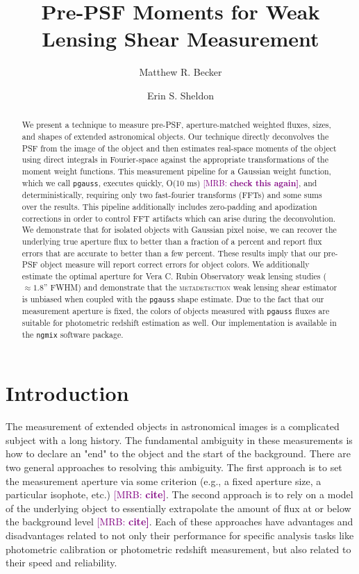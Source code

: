 \documentclass[twocolappendix, appendixfloats, numberedappendix, twocolumn, apj]{openjournal}
\newcommand{\mrb}[1]{\textcolor{purple}{[MRB: \bf #1]}\xspace}
\newcommand{\mdet}{\textsc{metadetection}\xspace}
\newcommand{\pgauss}{\texttt{pgauss}\xspace}
\begin{document}
\title{Pre-PSF Moments for Weak Lensing Shear Measurement}

\author{Matthew R. Becker}
\author{Erin S. Sheldon}

\begin{abstract}
  We present a technique to measure pre-PSF, aperture-matched weighted fluxes, sizes,
  and shapes of extended astronomical objects. Our technique directly deconvolves the
  PSF from the image of the object and then estimates real-space moments of the object
  using direct integrals in Fourier-space against the appropriate transformations of the
  moment weight functions. This measurement pipeline for a Gaussian weight function,
  which we call \pgauss, executes quickly, O(10 ms) \mrb{check this again}, and
  deterministically, requiring only two fast-fourier transforms (FFTs) and some sums
  over the results. This pipeline additionally includes zero-padding and apodization
  corrections in order to control FFT artifacts which can arise during the
  deconvolution. We demonstrate that for isolated objects with Gaussian pixel noise, 
  we can recover the underlying true aperture flux to better than a fraction of a percent 
  and report flux errors that are accurate to better than a few percent. These results imply that 
  our pre-PSF object measure will report correct errors for object colors. We additionally estimate the optimal
  aperture for Vera C. Rubin Observatory weak lensing studies ($\approx1.8$'' FWHM) and
  demonstrate that the \mdet weak lensing shear estimator is unbiased when coupled with
  the \pgauss shape estimate. Due to the fact that our measurement aperture is fixed,
  the colors of objects measured with \pgauss fluxes are suitable for photometric
  redshift estimation as well. Our implementation is available in the \texttt{ngmix}
  software package.
\end{abstract}

\section{Introduction}\label{sec:intro}

The measurement of extended objects in astronomical images is a complicated subject with a long
history. The fundamental ambiguity in these measurements is how to declare an "end" to the object
and the start of the background. There are two general approaches to resolving this ambiguity. The
first approach is to set the measurement aperture via some criterion (e.g., a fixed aperture size,
a particular isophote, etc.) \mrb{cite}. The second approach is to rely on a model of the underlying object to
essentially extrapolate the amount of flux at or below the background level \mrb{cite}. Each of these approaches
have advantages and disadvantages related to not only their performance for specific analysis tasks
like photometric calibration or photometric redshift measurement, but also related to their speed and
reliability.
\end{document}
